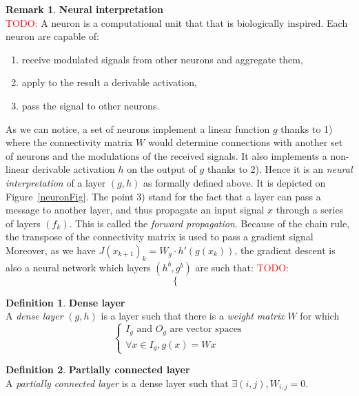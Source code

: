 \documentclass{article}
\theoremstyle{definition}
\newtheorem{definition}{Definition}[section]
\newtheorem{remark}{Remark}
\newcommand{\ovec}{}
\newcommand{\todo}[1]{\textcolor{red}{TODO: #1}}
\begin{document}
\begin{remark}\textbf{Neural interpretation}\\
\todo{}
A neuron is a computational unit that that is biologically inspired. Each neuron are capable of:
\begin{enumerate}
\item receive modulated signals from other neurons and aggregate them,
\item apply to the result a derivable activation,
\item pass the signal to other neurons.
\end{enumerate}
As we can notice, a set of neurons implement a linear function $g$ thanks to 1) where the connectivity matrix $W$ would determine connections with another set of neurons and the modulations of the received signals. It also implements a non-linear derivable activation $h$ on the output of $g$ thanks to 2). Hence it is an \emph{neural interpretation} of a layer $(g,h)$ as formally defined above. It is depicted on Figure~\ref{neuronFig}. The point 3) stand for the fact that a layer can pass a message to another layer, and thus propagate an input signal $x$ through a series of layers $(f_k)$. This is called the \emph{forward propagation}.
Because of the chain rule, the transpose of the connectivity matrix is used to pass a gradient signal
Moreover, as we have $J(\ovec{x_{k+1}})_{k} = W_g \cdot h'(g(x_k))$, the gradient descent is also a neural network which layers $(h^b,g^b)$ are such that:
\todo{}
$$
\left\{
\begin{array}{l}
  
\end{array}
\right.
$$


\end{remark}

\begin{definition}\textbf{Dense layer}\\
A \textit{dense layer} $(g,h)$ is a layer such that there is a \textit{weight matrix} $W$ for which
$$
\left\{
\begin{array}{l}
  I_g \mbox{ and } O_g \mbox{ are vector spaces} \\
  \forall x \in I_g, g(x) = Wx
\end{array}
\right.
$$
\end{definition}

\begin{definition}\textbf{Partially connected layer}\\
A \textit{partially connected layer} is a dense layer such that $\exists (i,j), W_{i,j} = 0$.
\end{definition}
\end{document}
